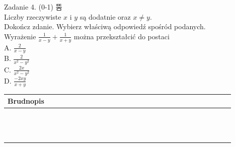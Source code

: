 \documentclass[10pt]{article}
\begin{document}
Zadanie 4. (0-1) 뚬\\
Liczby rzeczywiste \(x\) i \(y\) są dodatnie oraz \(x \neq y\).\\
Dokończ zdanie. Wybierz właściwą odpowiedź spośród podanych.\\
Wyrażenie \(\frac{1}{x-y}+\frac{1}{x+y}\) można przekształcić do postaci\\
A. \(\frac{2}{x-y}\)\\
B. \(\frac{2}{x^{2}-y^{2}}\)\\
C. \(\frac{2 x}{x^{2}-y^{2}}\)\\
D. \(\frac{-2 x y}{x+y}\)

\begin{center}
\begin{tabular}{|c|c|c|c|c|c|c|c|c|c|c|c|c|c|c|c|c|c|c|c|c|c|c|c|c|c|c|c|c|c|c|}
\hline
\multicolumn{5}{|l|}{Brudnopis} &  &  &  &  &  &  &  &  &  &  &  &  &  &  &  &  &  &  &  &  &  &  &  &  &  &  \\
\hline
 &  &  &  &  &  &  &  &  &  &  &  &  &  &  &  &  &  &  &  &  &  &  &  &  &  &  &  &  &  &  \\
\hline
 &  &  &  &  &  &  &  &  &  &  &  &  &  &  &  &  &  &  &  &  &  &  &  &  &  &  &  &  &  &  \\
\hline
 &  &  &  &  &  &  &  &  &  &  &  &  &  &  &  &  &  &  &  &  &  &  &  &  &  &  &  &  &  &  \\
\hline
 &  &  &  &  &  &  &  &  &  &  &  &  &  &  &  &  &  &  &  &  &  &  &  &  &  &  &  &  &  &  \\
\hline
 &  &  &  &  &  &  &  &  &  &  &  &  &  &  &  &  &  &  &  &  &  &  &  &  &  &  &  &  &  &  \\
\hline
 &  &  &  &  &  &  &  &  &  &  &  &  &  &  &  &  &  &  &  &  &  &  &  &  &  &  &  &  &  &  \\
\hline
 &  &  &  &  &  &  &  &  &  &  &  &  &  &  &  &  &  &  &  &  &  &  &  &  &  &  &  &  &  &  \\
\hline
 &  &  &  &  &  &  &  &  &  &  &  &  &  &  &  &  &  &  &  &  &  &  &  &  &  &  &  &  &  &  \\
\hline
 &  &  &  &  &  &  &  &  &  &  &  &  &  &  &  &  &  &  &  &  &  &  &  &  &  &  &  &  &  &  \\
\hline
 &  &  &  &  &  &  &  &  &  &  &  &  &  &  &  &  &  &  &  &  &  &  &  &  &  &  &  &  &  &  \\
\hline
 &  &  &  &  &  &  &  &  &  &  &  &  &  &  &  &  &  &  &  &  &  &  &  &  &  &  &  &  &  &  \\
\hline
 &  &  &  &  &  &  &  &  &  &  &  &  &  &  &  &  &  &  &  &  &  &  &  &  &  &  &  &  &  &  \\
\hline
 &  &  &  &  &  &  &  &  &  &  &  &  &  &  &  &  &  &  &  &  &  &  &  &  &  &  &  &  &  &  \\
\hline
\end{tabular}
\end{center}
\end{document}
